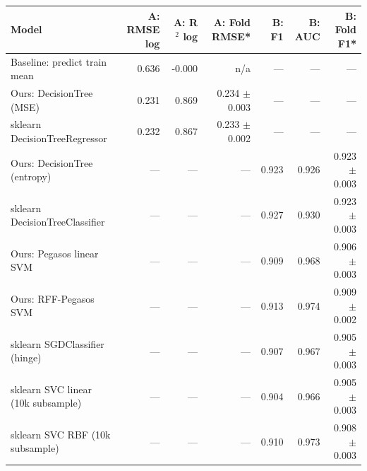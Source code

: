 \begin{tabular}{@{}lrrrrrr@{}}
\toprule
Model & A: RMSE log & A: R$^2$ log & A: Fold RMSE* & B: F1 & B: AUC & B: Fold F1* \\
\midrule
Baseline: predict train mean & 0.636 & -0.000 & n/a & — & — & — \\
Ours: DecisionTree (MSE) & 0.231 & 0.869 & 0.234 $\pm$ 0.003 & — & — & — \\
sklearn DecisionTreeRegressor & 0.232 & 0.867 & 0.233 $\pm$ 0.002 & — & — & — \\
Ours: DecisionTree (entropy) & — & — & — & 0.923 & 0.926 & 0.923 $\pm$ 0.003 \\
sklearn DecisionTreeClassifier & — & — & — & 0.927 & 0.930 & 0.923 $\pm$ 0.003 \\
Ours: Pegasos linear SVM & — & — & — & 0.909 & 0.968 & 0.906 $\pm$ 0.003 \\
Ours: RFF-Pegasos SVM & — & — & — & 0.913 & 0.974 & 0.909 $\pm$ 0.002 \\
sklearn SGDClassifier (hinge) & — & — & — & 0.907 & 0.967 & 0.905 $\pm$ 0.003 \\
sklearn SVC linear (10k subsample) & — & — & — & 0.904 & 0.966 & 0.905 $\pm$ 0.003 \\
sklearn SVC RBF (10k subsample) & — & — & — & 0.910 & 0.973 & 0.908 $\pm$ 0.003 \\
\bottomrule
\end{tabular}
